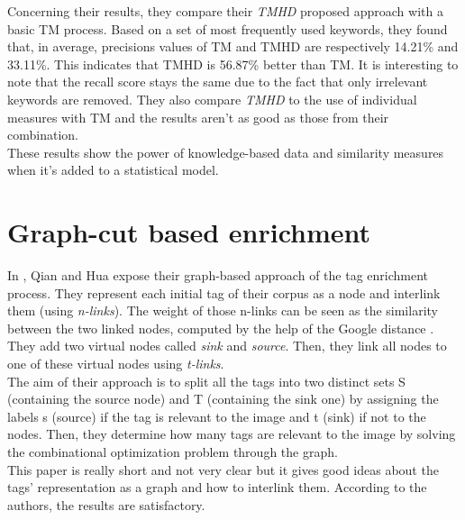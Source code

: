 Concerning their results, they compare their \emph{TMHD} proposed approach with a basic TM process. Based on a set of most frequently used keywords, they found that, in average, precisions values of TM and TMHD are respectively 14.21\% and 33.11\%. This indicates that TMHD is 56.87\% better than TM. It is interesting to note that the recall score stays the same due to the fact that only irrelevant keywords are removed. They also compare \emph{TMHD} to the use of individual measures with TM and the results aren't as good as those from their combination.\\
These results show the power of knowledge-based data and similarity measures when it's added to a statistical model.

\section{Graph-cut based enrichment} %
\label{sec:graph_cut_based_enrichment}
In \cite{qian2011graph}, Qian and Hua expose their graph-based approach of the tag enrichment process. They represent each initial tag of their corpus as a node and interlink them (using \emph{n-links}). The weight of those n-links can be seen as the similarity between the two linked nodes, computed by the help of the Google distance \cite{cilibrasi2007google}. They add two virtual nodes called \emph{sink} and \emph{source}. Then, they link all nodes to one of these virtual nodes using \emph{t-links}.\\

The aim of their approach is to split all the tags into two distinct sets S (containing the source node) and T (containing the sink one) by assigning the labels s (source) if the tag is relevant to the image and t (sink) if not to the nodes. Then, they determine how many tags are relevant to the image by solving the combinational optimization problem through the graph.\\

This paper is really short and not very clear but it gives good ideas about the tags' representation as a graph and how to interlink them. According to the authors, the results are satisfactory.   

